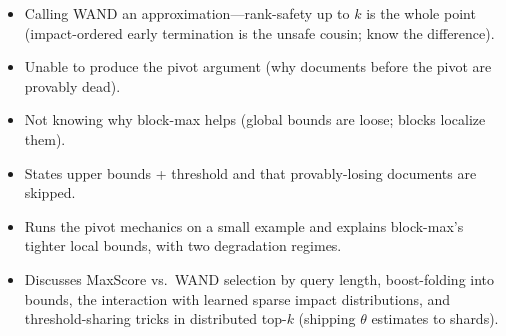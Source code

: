 \begin{interviewq}
\redflags
\begin{itemize}
    \item Calling WAND an approximation---rank-safety up to $k$ is the whole point (impact-ordered early termination is the unsafe cousin; know the difference).
    \item Unable to produce the pivot argument (why documents before the pivot are provably dead).
    \item Not knowing why block-max helps (global bounds are loose; blocks localize them).
\end{itemize}


\goodgreat
\begin{itemize}
    \item {} States upper bounds + threshold and that provably-losing documents are skipped.
    \item {} Runs the pivot mechanics on a small example and explains block-max's tighter local bounds, with two degradation regimes.
    \item {} Discusses MaxScore vs.\ WAND selection by query length, boost-folding into bounds, the interaction with learned sparse impact distributions, and threshold-sharing tricks in distributed top-$k$ (shipping $\theta$ estimates to shards).
\end{itemize}

\end{interviewq}

